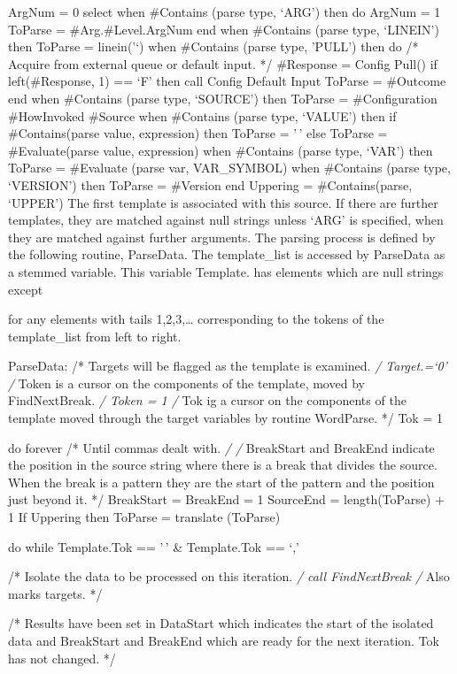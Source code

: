ArgNum = 0 select when \#Contains (parse type, `ARG') then do ArgNum = 1
ToParse = \#Arg.\#Level.ArgNum end when \#Contains (parse type,
`LINEIN') then ToParse = linein('`) when \#Contains (parse type, 'PULL')
then do /* Acquire from external queue or default input. */ \#Response =
Config Pull() if left(\#Response, 1) == `F' then call Config Default
Input ToParse = \#Outcome end when \#Contains (parse type, `SOURCE')
then ToParse = \#Configuration \#HowInvoked \#Source when \#Contains
(parse type, `VALUE') then if \#Contains(parse value, expression) then
ToParse = '\,' else ToParse = \#Evaluate(parse value, expression) when
\#Contains (parse type, `VAR') then ToParse = \#Evaluate (parse var,
VAR\_SYMBOL) when \#Contains (parse type, `VERSION') then ToParse =
\#Version end Uppering = \#Contains(parse, `UPPER') The first template
is associated with this source. If there are further templates, they are
matched against null strings unless `ARG' is specified, when they are
matched against further arguments. The parsing process is defined by the
following routine, ParseData. The template\_list is accessed by
ParseData as a stemmed variable. This variable Template. has elements
which are null strings except

for any elements with tails 1,2,3,\ldots{} corresponding to the tokens
of the template\_list from left to right.

ParseData: /* Targets will be flagged as the template is examined.
\emph{/ Target.=`0' /} Token is a cursor on the components of the
template, moved by FindNextBreak. \emph{/ Token = 1 /} Tok ig a cursor
on the components of the template moved through the target variables by
routine WordParse. */ Tok = 1

do forever /* Until commas dealt with. \emph{/ /} BreakStart and
BreakEnd indicate the position in the source string where there is a
break that divides the source. When the break is a pattern they are the
start of the pattern and the position just beyond it. */ BreakStart =
BreakEnd = 1 SourceEnd = length(ToParse) + 1 If Uppering then ToParse =
translate (ToParse)

do while Template.Tok == '\,' \& Template.Tok == `,'

/* Isolate the data to be processed on this iteration. \emph{/ call
FindNextBreak /} Also marks targets. */

/* Results have been set in DataStart which indicates the start of the
isolated data and BreakStart and BreakEnd which are ready for the next
iteration. Tok has not changed. */

